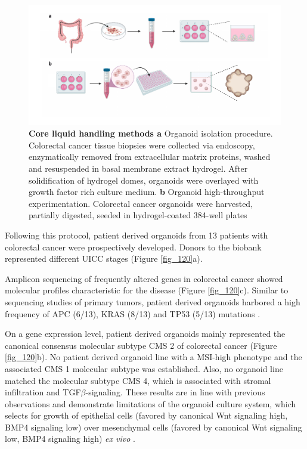 \begin{flushleft}
\begin{figure}[h!]
\centering
\includegraphics[width=\textwidth,
                height=\textheight,
                keepaspectratio]{figures/promise/pdf/fig_0_1.pdf}
\caption{\textbf{Core liquid handling methods a} Organoid isolation procedure. Colorectal cancer tissue biopsies were collected via endoscopy, enzymatically removed from extracellular matrix proteins, washed and resuspended in basal membrane extract hydrogel. After solidification of hydrogel domes, organoids were overlayed with growth factor rich culture medium. \textbf{b} Organoid high-throughput experimentation. Colorectal cancer organoids were harvested, partially digested, seeded in hydrogel-coated 384-well plates}
\label{fig_110}
\end{figure}

\newpage
Following this protocol, patient derived organoids from 13 patients with colorectal cancer were prospectively developed. Donors to the biobank represented different UICC stages (Figure \ref{fig_120}a). 

\bigbreak
Amplicon sequencing of frequently altered genes in colorectal cancer showed molecular profiles characteristic for the disease (Figure \ref{fig_120}c). Similar to sequencing studies of primary tumors, patient derived organoids harbored a high frequency of APC (6/13), KRAS (8/13) and TP53 (5/13) mutations \cite{Muzny2012-hr}. 

\bigbreak
On a gene expression level, patient derived organoids mainly represented the canonical consensus molecular subtype CMS 2 of colorectal cancer \cite{Guinney2015-ex} (Figure \ref{fig_120}b). No patient derived organoid line with a MSI-high phenotype and the associated CMS 1 molecular subtype was established. Also, no organoid line matched the molecular subtype CMS 4, which is associated with stromal infiltration and TGF\(\beta\)-signaling. These results are in line with previous observations \cite{Van_De_Wetering2015-ko, Schutte2017-fl} and demonstrate limitations of the organoid culture system, which selects for growth of epithelial cells (favored by canonical Wnt signaling high, BMP4 signaling low) over mesenchymal cells (favored by canonical Wnt signaling low, BMP4 signaling high) \textit{ex vivo} \cite{Sato2011-lh}.


\end{flushleft}
